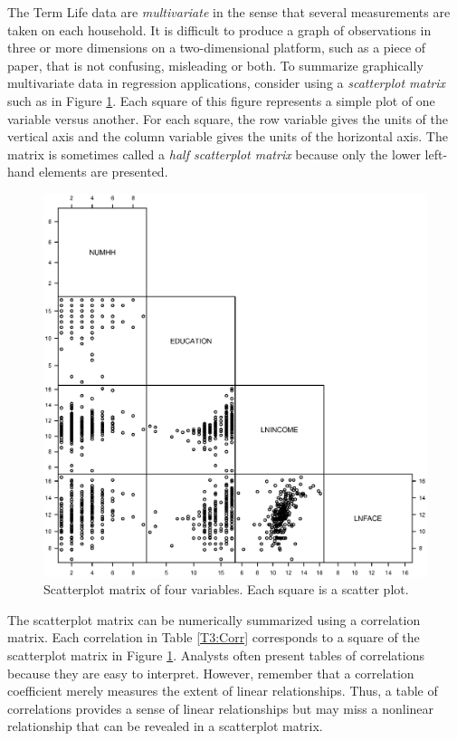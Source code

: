The Term Life data are \emph{multivariate} in the sense that several
measurements are taken on each household. It is difficult to produce
a graph of observations in three or more dimensions on a
two-dimensional platform, such as a piece of paper, that is not
confusing, misleading or both. To summarize graphically multivariate
data in regression applications, consider using a \emph{scatterplot
matrix} such as in Figure \ref{F3:TermLifeSMatrix}. Each square of
this figure represents a simple plot of one variable versus another.
For each square, the row variable gives the units of the vertical
axis and the column variable gives the units of the horizontal axis.
The matrix is sometimes called a \emph{half scatterplot matrix}
because only the lower left-hand elements are presented.

\begin{figure}[htp]
  \begin{center}
    \includegraphics[width=1\textwidth]{Chapter3/F3TermLifeSMatrix.eps}
    \caption{\label{F3:TermLifeSMatrix} \small  Scatterplot
matrix of four variables. Each square is a scatter plot.}
  \end{center}
\end{figure}

The scatterplot matrix can be numerically summarized using a
correlation matrix. Each correlation in Table \ref{T3:Corr}
corresponds to a square of the scatterplot matrix in Figure
\ref{F3:TermLifeSMatrix}. Analysts often present tables of
correlations because they are easy to interpret. However, remember
that a correlation coefficient merely measures the extent of linear
relationships. Thus, a table of correlations provides a sense of
linear relationships but may miss a nonlinear relationship that can
be revealed in a scatterplot matrix.




